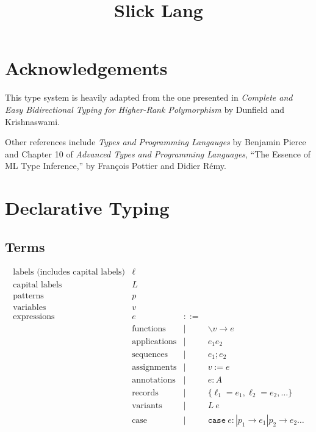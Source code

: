 \documentclass{article}
\title{Slick Lang}
\date{}
\author{}
\newcommand{\define}{::=}
\newcommand{\arrow}{\to}
\newcommand{\rcd}[1]{\{#1\}}
\newcommand{\pat}{p}
\newcommand{\case}[2]{\texttt{case} \ {#1}: {#2}}
\newcommand{\lbl}{\ell}
\newcommand{\expr}{e}
\newcommand{\var}{v}
\newcommand{\tp}{A}
\begin{document}
\maketitle

\section{Acknowledgements}

This type system is heavily adapted from the one presented in \textit{Complete
and Easy Bidirectional Typing for Higher-Rank Polymorphism} by Dunfield and
Krishnaswami.

Other references include \textit{Types and Programming Langauges} by Benjamin
Pierce and Chapter 10 of \textit{Advanced Types and Programming Languages},
``The Essence of ML Type Inference,'' by Fran\c{c}ois Pottier and Didier
R\'{e}my.

\section{Declarative Typing}

\subsection{Terms}

\[
  \begin{array}{llll}
    \text{labels (includes capital labels)} & \lbl & & \\
    \text{capital labels} & L & & \\
    \text{patterns} & \pat & & \\
    \text{variables} & \var & & \\
    \text{expressions} & \expr & \define & \\
    & \text{functions} & | & \backslash \var
                           \arrow \expr \\
    & \text{applications} & | & \expr_1 \expr_2 \\
    & \text{sequences} & | & \expr_1 ; \expr_2 \\
    & \text{assignments} & | & \var := \expr \\
    & \text{annotations} & | & \expr : \tp \\
    & \text{records} & | & \rcd{\lbl_1=\expr_1, \lbl_2=\expr_2,\dots} \\
    & \text{variants} & | & L \ \expr \\
    & \text{case} & | & \case{\expr}{| \pat_1 \arrow \expr_1 | \pat_2 \arrow
                        \expr_2 \dots} \\
  \end{array}
\]
\end{document}

